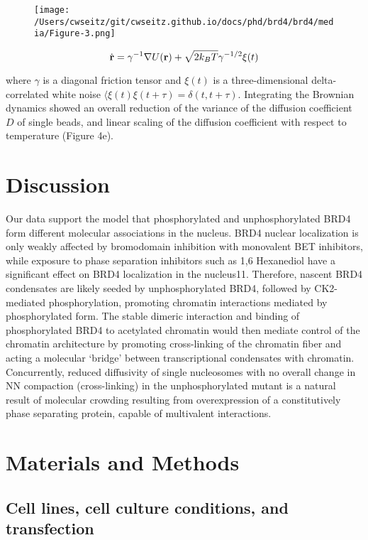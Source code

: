 \begin{figure}[t]
\texttt{[image: /Users/cwseitz/git/cwseitz.github.io/docs/phd/brd4/brd4/media/Figure-3.png]}
\caption{}
\end{figure}

\begin{equation*}
\dot{\bold{r}} = \gamma^{-1}\nabla U(\bold{r}) +\sqrt{2 k_{B}T}\gamma^{-1/2}\xi(t)
\end{equation*}

where $\gamma$ is a diagonal friction tensor and $\xi(t)$ is a three-dimensional delta-correlated white noise $\langle \xi(t)\xi(t+\tau)  = \delta(t,t+\tau)$. Integrating the Brownian dynamics showed an overall reduction of the variance of the diffusion coefficient $D$ of single beads, and linear scaling of the diffusion coefficient with respect to temperature (Figure 4e).

\section{Discussion}

Our data support the model that phosphorylated and unphosphorylated BRD4 form different molecular associations in the nucleus. BRD4 nuclear localization is only weakly affected by bromodomain inhibition with monovalent BET inhibitors, while exposure to phase separation inhibitors such as 1,6 Hexanediol have a significant effect on BRD4 localization in the nucleus11. Therefore, nascent BRD4 condensates are likely seeded by unphosphorylated BRD4, followed by CK2-mediated phosphorylation, promoting chromatin interactions mediated by phosphorylated form. The stable dimeric interaction and binding of phosphorylated BRD4 to acetylated chromatin would then mediate control of the chromatin architecture by promoting cross-linking of the chromatin fiber and acting a molecular ‘bridge’ between transcriptional condensates with chromatin. Concurrently, reduced diffusivity of single nucleosomes with no overall change in NN compaction (cross-linking) in the unphosphorylated mutant is a natural result of molecular crowding resulting from overexpression of a constitutively phase separating protein, capable of multivalent interactions. 

\section{Materials and Methods}

\subsection{Cell lines, cell culture conditions, and transfection}

